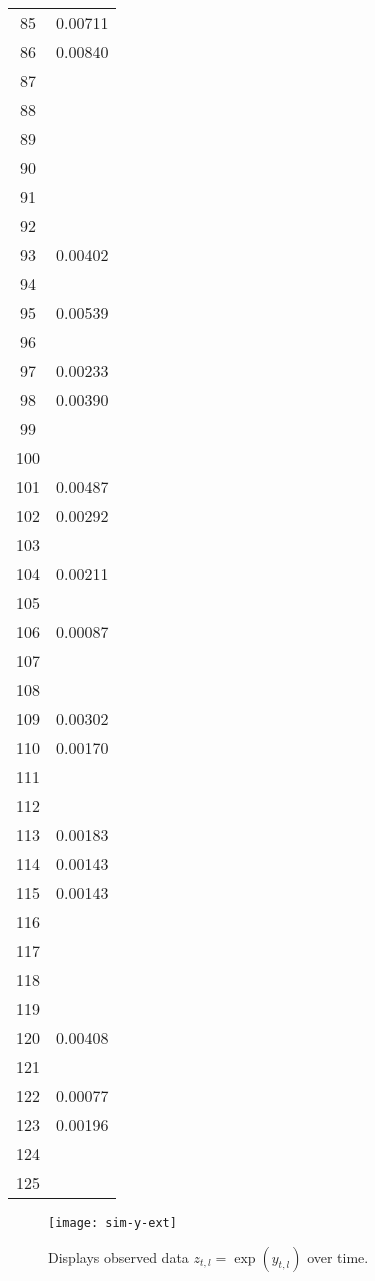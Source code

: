 \documentclass{elsarticle}
\begin{document}
\begin{center}
\begin{longtable}{|c|c|}
  85 & 0.00711 \\
  86 & 0.00840 \\
  87 &  \\
  88 &  \\
  89 &  \\
  90 &  \\
  91 &  \\
  92 &  \\
  93 & 0.00402 \\
  94 &  \\
  95 & 0.00539 \\
  96 &  \\
  97 & 0.00233 \\
  98 & 0.00390 \\
  99 &  \\
  100 &  \\
  101 & 0.00487 \\
  102 & 0.00292 \\
  103 &  \\
  104 & 0.00211 \\
  105 &  \\
  106 & 0.00087 \\
  107 &  \\
  108 &  \\
  109 & 0.00302 \\
  110 & 0.00170 \\
  111 &  \\
  112 &  \\
  113 & 0.00183 \\
  114 & 0.00143 \\
  115 & 0.00143 \\
  116 &  \\
  117 &  \\
  118 &  \\
  119 &  \\
  120 & 0.00408 \\
  121 &  \\
  122 & 0.00077 \\
  123 & 0.00196 \\
  124 &  \\
  125 & 
\label{fig:z}
\end{longtable}
\end{center}

\clearpage

\begin{figure}[ht]
\texttt{[image: sim-y-ext]}
\caption{Displays observed data $z_{t,l} = \exp(y_{t,l})$ over time.}
\end{figure}
\end{document}
